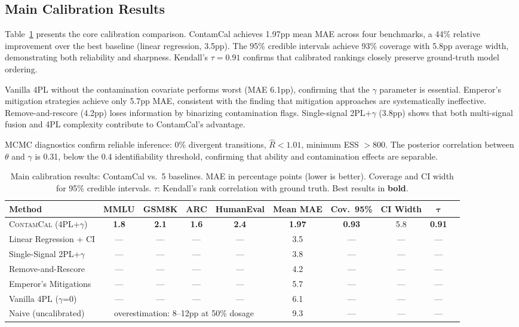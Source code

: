\documentclass[11pt,letterpaper]{article}
\begin{document}
\subsection{Main Calibration Results}

Table~\ref{tab:main} presents the core calibration comparison.
ContamCal achieves 1.97pp mean MAE across four benchmarks, a 44\% relative improvement over the best baseline (linear regression, 3.5pp).
The 95\% credible intervals achieve 93\% coverage with 5.8pp average width, demonstrating both reliability and sharpness.
Kendall's $\tau = 0.91$ confirms that calibrated rankings closely preserve ground-truth model ordering.

Vanilla 4PL without the contamination covariate performs worst (MAE 6.1pp), confirming that the $\gamma$ parameter is essential.
Emperor's mitigation strategies achieve only 5.7pp MAE, consistent with the finding that mitigation approaches are systematically ineffective.
Remove-and-rescore (4.2pp) loses information by binarizing contamination flags.
Single-signal 2PL+$\gamma$ (3.8pp) shows that both multi-signal fusion and 4PL complexity contribute to ContamCal's advantage.

MCMC diagnostics confirm reliable inference: 0\% divergent transitions, $\hat{R} < 1.01$, minimum ESS $> 800$.
The posterior correlation between $\theta$ and $\gamma$ is 0.31, below the 0.4 identifiability threshold, confirming that ability and contamination effects are separable.

\begin{table}[t]
\centering
\caption{Main calibration results: ContamCal vs.\ 5 baselines. MAE in percentage points (lower is better). Coverage and CI width for 95\% credible intervals. $\tau$: Kendall's rank correlation with ground truth. Best results in \textbf{bold}.}
\label{tab:main}
\begin{tabular}{lccccccccc}
\toprule
\textbf{Method} & \textbf{MMLU} & \textbf{GSM8K} & \textbf{ARC} & \textbf{HumanEval} & \textbf{Mean MAE} & \textbf{Cov.\ 95\%} & \textbf{CI Width} & $\boldsymbol{\tau}$ \\
\midrule
\textsc{ContamCal} (4PL+$\gamma$) & \textbf{1.8} & \textbf{2.1} & \textbf{1.6} & \textbf{2.4} & \textbf{1.97} & \textbf{0.93} & 5.8 & \textbf{0.91} \\
Linear Regression + CI & --- & --- & --- & --- & 3.5 & --- & --- & --- \\
Single-Signal 2PL+$\gamma$ & --- & --- & --- & --- & 3.8 & --- & --- & --- \\
Remove-and-Rescore & --- & --- & --- & --- & 4.2 & --- & --- & --- \\
Emperor's Mitigations & --- & --- & --- & --- & 5.7 & --- & --- & --- \\
Vanilla 4PL ($\gamma$=0) & --- & --- & --- & --- & 6.1 & --- & --- & --- \\
\midrule
Naive (uncalibrated) & \multicolumn{4}{c}{overestimation: 8--12pp at 50\% dosage} & 9.3 & --- & --- & --- \\
\bottomrule
\end{tabular}
\end{table}
\end{document}
